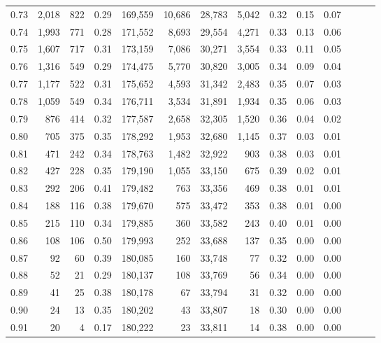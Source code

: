\begin{tabular}{rrrrrrrrrrrrrr}
0.73 &  2,018 &    822 &  0.29 &  169,559 &   10,686 &  28,783 &   5,042 &  0.32 &  0.15 &      0.07 \\
0.74 &  1,993 &    771 &  0.28 &  171,552 &    8,693 &  29,554 &   4,271 &  0.33 &  0.13 &      0.06 \\
0.75 &  1,607 &    717 &  0.31 &  173,159 &    7,086 &  30,271 &   3,554 &  0.33 &  0.11 &      0.05 \\
0.76 &  1,316 &    549 &  0.29 &  174,475 &    5,770 &  30,820 &   3,005 &  0.34 &  0.09 &      0.04 \\
0.77 &  1,177 &    522 &  0.31 &  175,652 &    4,593 &  31,342 &   2,483 &  0.35 &  0.07 &      0.03 \\
0.78 &  1,059 &    549 &  0.34 &  176,711 &    3,534 &  31,891 &   1,934 &  0.35 &  0.06 &      0.03 \\
0.79 &    876 &    414 &  0.32 &  177,587 &    2,658 &  32,305 &   1,520 &  0.36 &  0.04 &      0.02 \\
0.80 &    705 &    375 &  0.35 &  178,292 &    1,953 &  32,680 &   1,145 &  0.37 &  0.03 &      0.01 \\
0.81 &    471 &    242 &  0.34 &  178,763 &    1,482 &  32,922 &     903 &  0.38 &  0.03 &      0.01 \\
0.82 &    427 &    228 &  0.35 &  179,190 &    1,055 &  33,150 &     675 &  0.39 &  0.02 &      0.01 \\
0.83 &    292 &    206 &  0.41 &  179,482 &      763 &  33,356 &     469 &  0.38 &  0.01 &      0.01 \\
0.84 &    188 &    116 &  0.38 &  179,670 &      575 &  33,472 &     353 &  0.38 &  0.01 &      0.00 \\
0.85 &    215 &    110 &  0.34 &  179,885 &      360 &  33,582 &     243 &  0.40 &  0.01 &      0.00 \\
0.86 &    108 &    106 &  0.50 &  179,993 &      252 &  33,688 &     137 &  0.35 &  0.00 &      0.00 \\
0.87 &     92 &     60 &  0.39 &  180,085 &      160 &  33,748 &      77 &  0.32 &  0.00 &      0.00 \\
0.88 &     52 &     21 &  0.29 &  180,137 &      108 &  33,769 &      56 &  0.34 &  0.00 &      0.00 \\
0.89 &     41 &     25 &  0.38 &  180,178 &       67 &  33,794 &      31 &  0.32 &  0.00 &      0.00 \\
0.90 &     24 &     13 &  0.35 &  180,202 &       43 &  33,807 &      18 &  0.30 &  0.00 &      0.00 \\
0.91 &     20 &      4 &  0.17 &  180,222 &       23 &  33,811 &      14 &  0.38 &  0.00 &      0.00 \\

\end{tabular}
